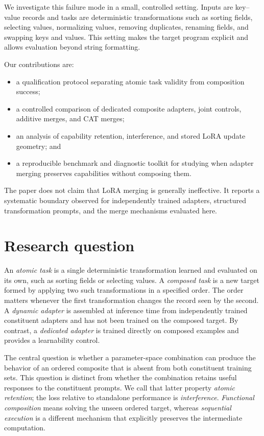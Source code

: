 \documentclass[10pt,twocolumn]{article}
\begin{document}
We investigate this failure mode in a small, controlled setting. Inputs are key--value records and tasks are deterministic transformations such as sorting fields, selecting values, normalizing values, removing duplicates, renaming fields, and swapping keys and values. This setting makes the target program explicit and allows evaluation beyond string formatting.

Our contributions are:
\begin{itemize}
    \item a qualification protocol separating atomic task validity from composition success;
    \item a controlled comparison of dedicated composite adapters, joint controls, additive merges, and CAT merges;
    \item an analysis of capability retention, interference, and stored LoRA update geometry; and
    \item a reproducible benchmark and diagnostic toolkit for studying when adapter merging preserves capabilities without composing them.
\end{itemize}

The paper does not claim that LoRA merging is generally ineffective. It reports a systematic boundary observed for independently trained adapters, structured transformation prompts, and the merge mechanisms evaluated here.

\section{Research question}

An \emph{atomic task} is a single deterministic transformation learned and evaluated on its own, such as sorting fields or selecting values. A \emph{composed task} is a new target formed by applying two such transformations in a specified order. The order matters whenever the first transformation changes the record seen by the second. A \emph{dynamic adapter} is assembled at inference time from independently trained constituent adapters and has not been trained on the composed target. By contrast, a \emph{dedicated adapter} is trained directly on composed examples and provides a learnability control.

The central question is whether a parameter-space combination can produce the behavior of an ordered composite that is absent from both constituent training sets. This question is distinct from whether the combination retains useful responses to the constituent prompts. We call that latter property \emph{atomic retention}; the loss relative to standalone performance is \emph{interference}. \emph{Functional composition} means solving the unseen ordered target, whereas \emph{sequential execution} is a different mechanism that explicitly preserves the intermediate computation.
\end{document}
